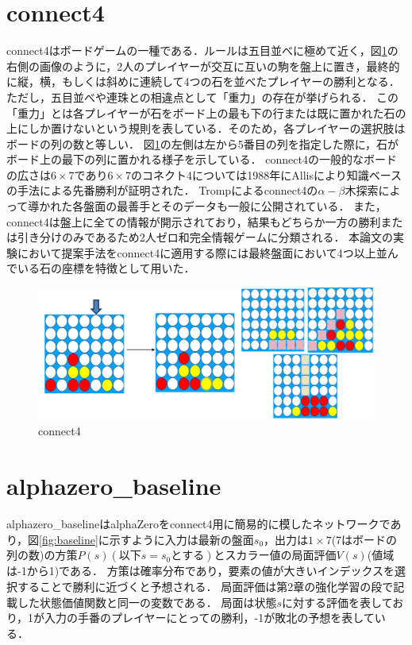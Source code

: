 \section{connect4}
connect4はボードゲームの一種である．ルールは五目並べに極めて近く，図\ref{fig:connect4}の右側の画像のように，2人のプレイヤーが交互に互いの駒を盤上に置き，最終的に縦，横，もしくは斜めに連続して4つの石を並べたプレイヤーの勝利となる．ただし，五目並べや連珠との相違点として「重力」の存在が挙げられる．
この「重力」とは各プレイヤーが石をボード上の最も下の行または既に置かれた石の上にしか置けないという規則を表している．そのため，各プレイヤーの選択肢はボードの列の数と等しい．
図\ref{fig:connect4}の左側は左から5番目の列を指定した際に，石がボード上の最下の列に置かれる様子を示している．
connect4の一般的なボードの広さは$6\times7$であり$6\times7$のコネクト4については1988年にAllis\cite{allis}により知識ベースの手法による先番勝利が証明された．
Tromp\cite{data}によるconnect4の$\alpha-\beta$木探索によって導かれた各盤面の最善手とそのデータも一般に公開されている．
また，connect4は盤上に全ての情報が開示されており，結果もどちらか一方の勝利または引き分けのみであるため2人ゼロ和完全情報ゲーム\cite{gairon}に分類される．
本論文の実験において提案手法をconnect4に適用する際には最終盤面において4つ以上並んでいる石の座標を特徴として用いた．
\begin{figure}[htbp]
	\centering
    \includegraphics[width=\linewidth]{./figure/connect4.png}
	\caption{connect4}
	\label{fig:connect4}
\end{figure}
\section{alphazero\_baseline}
alphazero\_baselineはalphaZeroをconnect4用に簡易的に模したネットワークであり，図\ref{fig:baseline}に示すように入力は最新の盤面$s_0$，出力は$1\times7$(7はボードの列の数)の方策$P(s)(以下s=s_0とする)$とスカラー値の局面評価$V(s)$(値域は-1から1)である．
方策は確率分布であり，要素の値が大きいインデックスを選択することで勝利に近づくと予想される．
局面評価は第2章の強化学習の段で記載した状態価値関数と同一の変数である．
局面は状態$s$に対する評価を表しており，1が入力の手番のプレイヤーにとっての勝利，-1が敗北の予想を表している．

